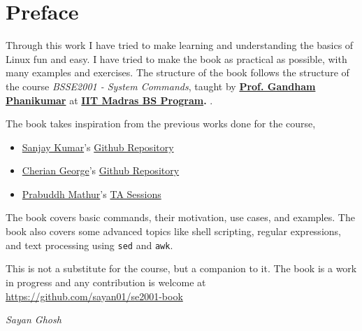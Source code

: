 \chapter*{Preface}

Through this work I have tried to make learning and
understanding the basics of Linux fun and easy. I have
tried to make the book as practical as possible, with
many examples and exercises. The structure of the book
follows the structure of the course \textit{BSSE2001
- System Commands}, taught by
\textbf{
\href{https://home.iitm.ac.in/gphani/}{Prof. Gandham Phanikumar}
}
at
\textbf{
\href{https://study.iitm.ac.in/ds/}{IIT Madras BS Program}.
}.

The book takes inspiration from the previous works done for the course,

\begin{itemize}
	\item \href{https://github.com/prassr}{Sanjay Kumar}'s
	\href{https://github.com/prassr/gnu-linux-commands}{Github Repository}
	\item \href{https://github.com/cheriangeorge}{Cherian George}'s
	\href{https://github.com/prassr/gnu-linux-commands}{Github Repository}
	\item \href{https://github.com/prabuddhmathur}{Prabuddh Mathur}'s
	\href{https://www.youtube.com/playlist?list=PLLuZiiAWg2wpaEOBWAVO7Jl35MQkOyi6-}{TA Sessions}
\end{itemize}

The book covers basic commands, their motivation, use cases, and examples.
The book also covers some advanced topics like shell scripting, regular expressions, and text processing using \texttt{sed} and \texttt{awk}.

This is not a substitute for the course, but a companion to it.
The book is a work in progress and any contribution is welcome at
\url{https://github.com/sayan01/se2001-book}

\begin{flushright}
	\textit{Sayan Ghosh}
\end{flushright}
